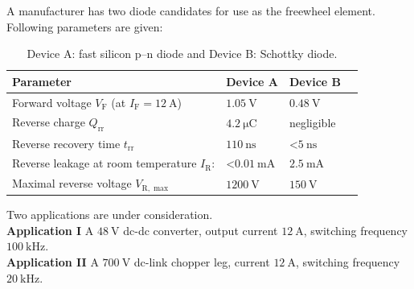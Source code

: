 


A manufacturer has two diode candidates for use as the freewheel element.
Following parameters are given:

\begin{table}[ht]
    \centering  %
    \begin{tabular}{llll}
        \toprule
        Parameter & Device A & Device B \\
        \midrule
        Forward voltage $V_\mathrm{F}$ (at $I_\mathrm{F} = \SI{12}{\ampere}$) &  $\SI{1.05}{\volt}$ &  $\SI{0.48}{\volt}$ \\ 
        Reverse charge $Q_\mathrm{rr}$ &  $\SI{4.2}{\micro\coulomb}$ &  negligible \\ 
        Reverse recovery time $t_\mathrm{rr}$ &  $\SI{110}{\nano\second}$  & <$\SI{5}{\nano\second}$ \\ 
        Reverse leakage at room temperature $I_\mathrm{R}$: & <$\SI{0.01}{\milli\ampere}$ &  $\SI{2.5}{\milli\ampere}$ \\
        Maximal reverse voltage  $V_\mathrm{R,\max}$ &  $\SI{1200}{\volt}$ &  $\SI{150}{\volt}$\\
        \bottomrule
    \end{tabular}
    \caption{Device A: fast silicon p--n diode and Device B: Schottky diode.}  %
    \label{table:ex01_deviceA}
\end{table}

Two applications are under consideration. \\
\textbf{Application I}
A $\SI{48}{\volt}$ dc-dc converter, output current $\SI{12}{\ampere}$, switching frequency $\SI{100}{\kilo\hertz}$. \\
\textbf{Application II}
A $\SI{700}{\volt}$ dc-link chopper leg, current $\SI{12}{\ampere}$, switching frequency $\SI{20}{\kilo\hertz}$.


